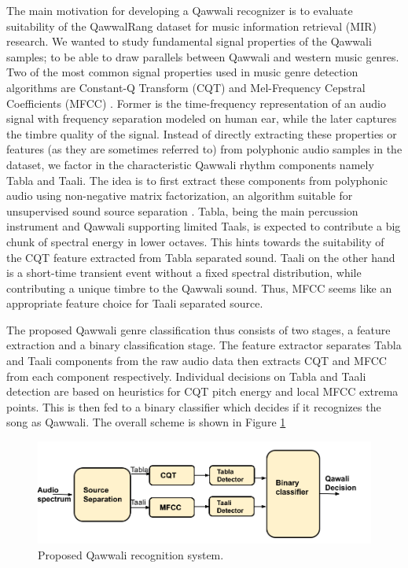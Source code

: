 \documentclass{article}
\begin{document}
The main motivation for developing a Qawwali recognizer is to evaluate suitability of the QawwalRang dataset for music information retrieval (MIR) research. We wanted to study fundamental signal properties of the Qawwali samples; to be able to draw parallels between Qawwali and western music genres. Two of the most common signal properties used in music genre detection algorithms are Constant-Q Transform (CQT) and Mel-Frequency Cepstral Coefficients (MFCC) \citep{panagakis}. Former is the time-frequency representation of an audio signal with frequency separation modeled on human ear, while the later captures the timbre quality of the signal. Instead of directly extracting these properties or features (as they are sometimes referred to) from polyphonic audio samples in the dataset, we factor in the characteristic Qawwali rhythm components namely Tabla and Taali. The idea is to first extract these components from polyphonic audio using non-negative matrix factorization, an algorithm suitable for unsupervised sound source separation \citep{virtanen}. Tabla, being the main percussion instrument and Qawwali supporting limited Taals, is expected to contribute a big chunk of spectral energy in lower octaves. This hints towards the suitability of the CQT feature extracted from Tabla separated sound. Taali on the other hand is a short-time transient event without a fixed spectral distribution, while contributing a unique timbre to the Qawwali sound. Thus, MFCC seems like an appropriate feature choice for Taali separated source.

The proposed Qawwali genre classification thus consists of two stages, a feature extraction and a binary classification stage. The feature extractor separates Tabla and Taali components from the raw audio data then extracts CQT and MFCC from each component respectively. Individual decisions on Tabla and Taali detection are based on heuristics for CQT pitch energy and local MFCC extrema points. This is then fed to a binary classifier which decides if it recognizes the song as Qawwali. The overall scheme is shown in Figure \ref{fig:block_dia}

\begin{figure}[htbp]
  \centering
  \includegraphics[scale=1.5, width=0.95\columnwidth]{qawali_detector}
  \caption{Proposed Qawwali recognition system.}
\label{fig:block_dia}
\end{figure}
\end{document}

